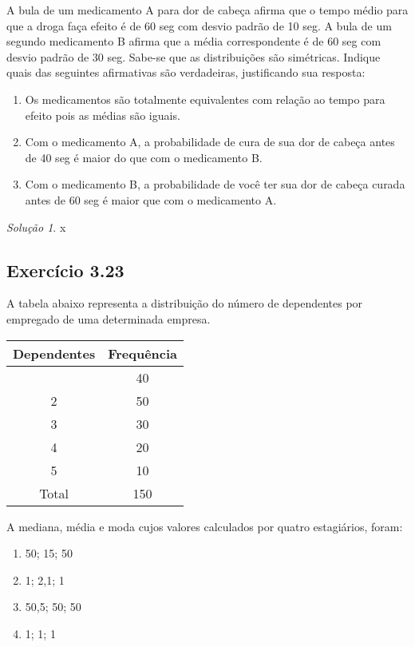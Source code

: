 \documentclass[
]{latex/krantz}
\providecommand{\tightlist}{%
  \setlength{\itemsep}{0pt}\setlength{\parskip}{0pt}}
\theoremstyle{definition}
\theoremstyle{definition}
\theoremstyle{definition}
\theoremstyle{definition}
\theoremstyle{remark}
\newtheorem*{solution}{Solução}
\begin{document}
A bula de um medicamento A para dor de cabeça afirma que o tempo médio para que a droga faça efeito é de 60 seg com desvio padrão de 10 seg. A bula de um segundo medicamento B afirma que a média correspondente é de 60 seg com desvio padrão de 30 seg. Sabe-se que as distribuições são simétricas. Indique quais das seguintes afirmativas são verdadeiras, justificando sua resposta:

\begin{enumerate}
\def\labelenumi{\alph{enumi})}
\tightlist
\item
  Os medicamentos são totalmente equivalentes com relação ao tempo para efeito pois as médias são iguais.
\item
  Com o medicamento A, a probabilidade de cura de sua dor de cabeça antes de 40 seg é maior do que com o medicamento B.
\item
  Com o medicamento B, a probabilidade de você ter sua dor de cabeça curada antes de 60 seg é maior que com o medicamento A.
\end{enumerate}

\begin{solution}
x
\end{solution}

\hypertarget{exr3-23}{%
\subsection*{Exercício 3.23}\label{exr3-23}}

A tabela abaixo representa a distribuição do número de dependentes por empregado de uma determinada empresa.

\begin{longtable}[]{@{}cc@{}}
\toprule\noalign{}
Dependentes & Frequência \\
\midrule\noalign{}
\endhead
\bottomrule\noalign{}
\endlastfoot
1 & 40 \\
2 & 50 \\
3 & 30 \\
4 & 20 \\
5 & 10 \\
Total & 150 \\
\end{longtable}

A mediana, média e moda cujos valores calculados por quatro estagiários, foram:

\begin{enumerate}
\def\labelenumi{\alph{enumi})}
\tightlist
\item
  50; 15; 50
\item
  1; 2,1; 1
\item
  50,5; 50; 50
\item
  1; 1; 1
\end{enumerate}
\end{document}
